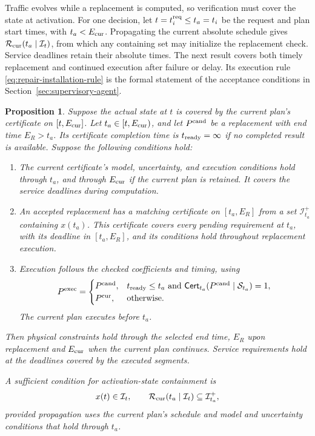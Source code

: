 \documentclass[final]{cas-sc}
\theoremstyle{definition}
\theoremstyle{plain}
\newtheorem{proposition}{Proposition}
\theoremstyle{definition}
\theoremstyle{plain}
\begin{document}
Traffic evolves while a replacement is computed, so verification must
cover the state at activation. For one decision, let
$t=t_i^{\rm req}\le t_a=t_i$ be the request and plan start times, with
$t_a<E_{\rm cur}$. Propagating the current absolute schedule gives
$\mathcal R_{\rm cur}(t_a\mid\mathcal I_t)$, from which any containing
set may initialize the replacement check. Service deadlines retain
their absolute times. The next result covers both timely replacement
and continued execution after failure or delay. Its execution rule
\eqref{eq:repair-installation-rule} is the formal statement of the acceptance
conditions in Section~\ref{sec:supervisory-agent}.

\begin{proposition}
\label{prop:repair-execution}
\label{prop:planned-handover}
Suppose the actual state at $t$ is covered by the current plan's
certificate on $[t,E_{\rm cur}]$. Let $t_a\in[t,E_{\rm cur})$, and let
$P^{\rm cand}$ be a replacement with end time $E_R>t_a$. Its
certificate completion time is $t_{\rm ready}=\infty$ if no completed
result is available. Suppose the following conditions hold:
\begin{enumerate}
\item The current certificate's model, uncertainty, and execution
conditions hold through $t_a$, and through $E_{\rm cur}$ if the current
plan is retained. It covers the service deadlines during computation.
\item An accepted replacement has a matching certificate on
$[t_a,E_R]$ from a set $\mathcal I_{t_a}^{+}$ containing $x(t_a)$. This
certificate covers every pending requirement at $t_a$, with its
deadline in $[t_a,E_R]$, and its conditions hold throughout replacement
execution.
\item Execution follows the checked coefficients and timing, using
\begin{equation}
P^{\rm exec}=\begin{cases}
P^{\rm cand},& t_{\rm ready}\le t_a\ \text{and}\
\mathsf{Cert}_{t_a}(P^{\rm cand}\mid\mathcal S_{t_a})=1,\\
P^{\rm cur},&\text{otherwise}.
\end{cases}
\label{eq:repair-installation-rule}
\end{equation}
The current plan executes before $t_a$.
\end{enumerate}
Then physical constraints hold through the selected end time, $E_R$
upon replacement and $E_{\rm cur}$ when the current plan continues.
Service requirements hold at the deadlines covered by the executed
segments.

A sufficient condition for activation-state containment is
\[
x(t)\in\mathcal I_t,\qquad
\mathcal R_{\rm cur}(t_a\mid\mathcal I_t)\subseteq\mathcal I_{t_a}^{+},
\]
provided propagation uses the current plan's schedule and model and
uncertainty conditions that hold through $t_a$.
\end{proposition}
\end{document}
